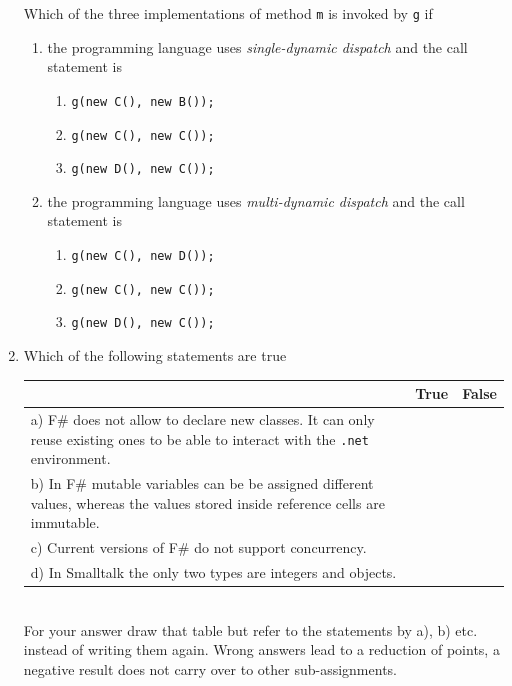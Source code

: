 \documentclass{article}
\begin{document}
\begin{enumerate}
Which of the three implementations of method \lstinline!m! is invoked by
\lstinline!g! if
\begin{enumerate}
\item the programming language uses \emph{single-dynamic dispatch} and
  the call statement is
 \begin{enumerate}
    \item \lstinline!g(new C(), new B());!
    \item \lstinline!g(new C(), new C());!
    \item \lstinline!g(new D(), new C());!
  \end{enumerate}
  \item the programming language uses \emph{multi-dynamic dispatch}
    and the call statement is
 \begin{enumerate}
    \item \lstinline!g(new C(), new D());!
    \item \lstinline!g(new C(), new C());!
    \item \lstinline!g(new D(), new C());!
    \end{enumerate}
\end{enumerate}\newpage
\item Which of the following statements are true\\
    \begin{tabular}{|p{6cm}|c|c|}\hline
      & True & False \\ \hline
      a) F\# does not allow to declare new classes. It can only reuse
      existing ones to be able to interact with the \texttt{.net} environment. & & \\\hline
      b) In F\# mutable variables can be be assigned different values, whereas
      the values stored inside reference cells are immutable. & & \\\hline
      c) Current versions of F\# do not support concurrency. & & \\\hline
      d) In Smalltalk the only two types are integers and objects. & & \\\hline
   \end{tabular}\\
   For your answer draw that table but refer to the statements by a),
   b) etc. instead of writing them again. Wrong answers lead to a
   reduction of points, a negative result does not carry over to other
   sub-assignments. 
\end{enumerate}
\end{document}
